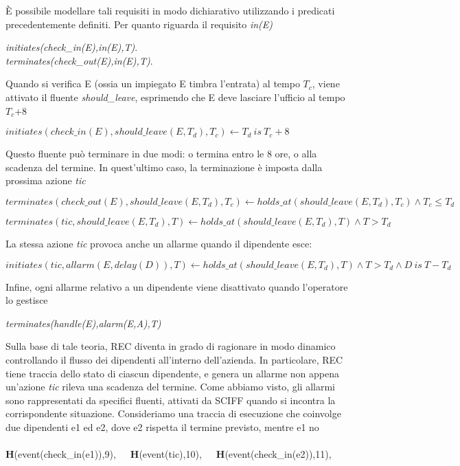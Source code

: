 \documentclass[a4paper,12pt]{report}
\begin{document}
È possibile modellare tali requisiti in modo dichiarativo utilizzando i predicati precedentemente definiti.
\newpage
Per quanto riguarda il requisito \textit{in(E)}
\begin{center}
\textit{initiates(check\_in(E),in(E),T)}.\\
\textit{terminates(check\_out(E),in(E),T)}.
\end{center}
Quando si verifica E (ossia un impiegato E timbra l'entrata) al tempo $T_c$, viene attivato il fluente \textit{should\_leave}, esprimendo che E deve lasciare l'ufficio al tempo $T_c$+8
\begin{center}
$initiates(check\_in(E),should\_leave(E,T_d),T_c)\leftarrow T_d\ is\ T_c+8$
\end{center}
Questo fluente può terminare in due modi: o termina entro le 8 ore, o alla scadenza del termine. In quest'ultimo caso, la terminazione è imposta dalla prossima azione \textit{tic}
\begin{center}
$terminates(check\_out(E),should\_leave(E,T_d),T_c)\leftarrow holds\_at(should\_leave(E,T_d),T_c)\wedge T_c\leq T_d$
\end{center}
\begin{center}
$terminates(tic,should\_leave(E,T_d),T)\leftarrow holds\_at(should\_leave(E,T_d),T)\wedge T>T_d$
\end{center}
La stessa azione \textit{tic} provoca anche un allarme quando il dipendente esce:
\begin{center}
$initiates(tic,allarm(E,delay(D)),T)\leftarrow holds\_at(should\_leave(E,T_d),T)\wedge T>T_d\wedge D\ is\ T-T_d$
\end{center}
Infine, ogni allarme relativo a un dipendente viene disattivato quando l'operatore lo gestisce
\begin{center}
\textit{terminates(handle(E),alarm(E,A),T)}
\end{center}
Sulla base di tale teoria, REC diventa in grado di ragionare in modo dinamico controllando il flusso dei dipendenti all'interno dell'azienda. In particolare, REC tiene traccia dello stato di ciascun dipendente, e genera un allarme non appena un'azione \textit{tic} rileva una scadenza del termine. Come abbiamo visto, gli allarmi sono rappresentati da specifici fluenti, attivati da SCIFF quando si incontra la corrispondente situazione.
\newpage
Consideriamo una traccia di esecuzione che coinvolge due dipendenti e1 ed e2, dove e2 rispetta il termine previsto, mentre e1 no\\
\\\textbf{H}(event(check\_in(e1)),9),\ \ \   \textbf{H}(event(tic),10),\ \ \  \textbf{H}(event(check\_in(e2)),11),\\
\end{document}
